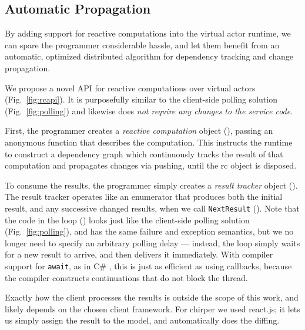 \subsection{Automatic Propagation}\label{sec:reactive}

By adding support for reactive computations into the virtual actor runtime, we can spare the programmer considerable hassle, and let them benefit from an automatic, optimized distributed algorithm for dependency tracking and change propagation. 

We propose a novel API for reactive computations over virtual actors (Fig.~\ref{fig:rcapi}). It is purposefully similar to the client-side polling solution (Fig.~\ref{fig:polling}) and likewise does \emph{not require any changes to the service code}. 

First, the programmer creates a \emph{reactive computation} object (), passing an anonymous function that describes the computation. This instructs the runtime to construct a dependency graph which continuously tracks the result of that computation and propagates changes via pushing, until the rc object is disposed.

To consume the results, the programmer simply creates a \emph{result tracker} object (). The result tracker operates like an enumerator that produces both the initial result, and any successive changed results, when we call \lstinline|NextResult| (). %
Note that the code in the loop () looks just like the client-side polling solution (Fig.~\ref{fig:polling}), and has the same failure and exception semantics, but we no longer need to specify an arbitrary polling delay --- instead, the loop simply waits for a new result to arrive, and then delivers it immediately. With compiler support for \lstinline|await|, as in C\# \cite{Bierman2012}, this is just as efficient as using callbacks, because the compiler constructs continuations that do not block the thread.

Exactly how the client processes the results is outside the scope of this work, and likely depends on the chosen client framework. For chirper  we used react.js; it lets us simply assign the result to the model, and automatically does the diffing.


 
